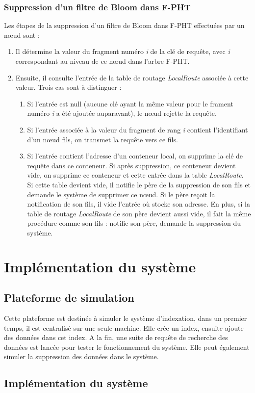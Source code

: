 \documentclass[a4paper,11pt]{report}
\begin{document}
\subsection{Suppression d'un filtre de Bloom dans F-PHT}
	Les étapes de la suppression d'un filtre de Bloom dans F-PHT effectuées par un nœud sont :
	\begin{enumerate}
		\item Il détermine la valeur du fragment numéro \textit{i} de la clé de requête, avec \textit{i} correspondant au niveau de ce nœud dans l'arbre F-PHT.
		\item Ensuite, il consulte l'entrée de la table de routage \textit{LocalRoute} associée à cette valeur. Trois cas sont à distinguer :
		\begin{enumerate}
			\item Si l'entrée est null (aucune clé ayant la même valeur pour le frament numéro \textit{i} a été ajoutée auparavant), le nœud rejette la requête.
			\item Si l'entrée associée à la valeur du fragment de rang \textit{i} contient l'identifiant d'un nœud fils, on transmet la requête vers ce fils.
			\item Si l'entrée contient l'adresse d'un conteneur local, on supprime la clé de requête dans ce conteneur. Si après suppression, ce conteneur devient vide, on supprime ce conteneur et cette entrée dans la table \textit{LocalRoute}. Si cette table devient vide, il notifie le père de la suppression de son fils et demande le système de supprimer ce nœud. Si le père reçoit la notification de son fils, il vide l'entrée où stocke son adresse. En plus, si la table de routage \textit{LocalRoute} de son père devient aussi vide, il fait la même procédure comme son fils : notifie son père, demande la suppression du système.
		\end{enumerate}
	\end{enumerate}

\chapter{Implémentation du système}
\section{Plateforme de simulation}
	Cette plateforme est destinée à simuler le système d'indexation, dans un premier temps, il est centralisé sur une seule machine. Elle crée un index, ensuite ajoute des données dans cet index. A la fin, une suite de requête de recherche des données est lancée pour tester le fonctionnement du système. Elle peut également simuler la suppression des données dans le système.
	
\section{Implémentation du système}
	
\end{document}
